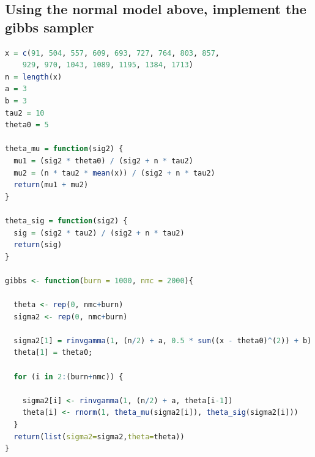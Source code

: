 \documentclass[20pt]{article} %
\begin{document}
\subsection{Using the normal model above, implement the gibbs sampler}
\begin{lstlisting}[language=R]
x = c(91, 504, 557, 609, 693, 727, 764, 803, 857, 
	929, 970, 1043, 1089, 1195, 1384, 1713)
n = length(x)
a = 3
b = 3
tau2 = 10
theta0 = 5

theta_mu = function(sig2) {
  mu1 = (sig2 * theta0) / (sig2 + n * tau2)
  mu2 = (n * tau2 * mean(x)) / (sig2 + n * tau2)
  return(mu1 + mu2)
}

theta_sig = function(sig2) {
  sig = (sig2 * tau2) / (sig2 + n * tau2)
  return(sig)
}

gibbs <- function(burn = 1000, nmc = 2000){
  
  theta <- rep(0, nmc+burn)
  sigma2 <- rep(0, nmc+burn)
  
  sigma2[1] = rinvgamma(1, (n/2) + a, 0.5 * sum((x - theta0)^(2)) + b)
  theta[1] = theta0; 
  
  for (i in 2:(burn+nmc)) {
    
    sigma2[i] <- rinvgamma(1, (n/2) + a, theta[i-1])
    theta[i] <- rnorm(1, theta_mu(sigma2[i]), theta_sig(sigma2[i]))
  }
  return(list(sigma2=sigma2,theta=theta))
}
\end{lstlisting}
\end{document}
